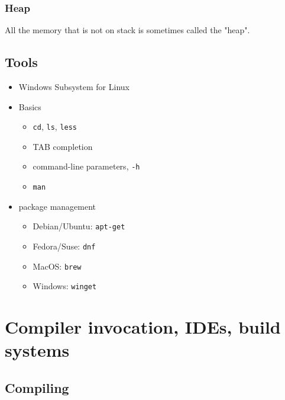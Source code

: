 \documentclass[12pt]{article}
\begin{document}

\subsubsection{Heap}
All the memory that is not on stack is sometimes called the "heap".

\subsection{Tools}

\begin{itemize}
    \item Windows Subsystem for Linux
    \item Basics
    \begin{itemize}
        \item \texttt{cd}, \texttt{ls}, \texttt{less}
        \item TAB completion
        \item command-line parameters, \texttt{-h}
        \item \texttt{man}
    \end{itemize}
    \item package management
    \begin{itemize}
        \item Debian/Ubuntu: \texttt{apt-get}
        \item Fedora/Suse: \texttt{dnf}
        \item MacOS: \texttt{brew}
        \item Windows: \texttt{winget}
    \end{itemize}
\end{itemize}



















\newpage
\section{Compiler invocation, IDEs, build systems}

\subsection{Compiling}
\end{document}
